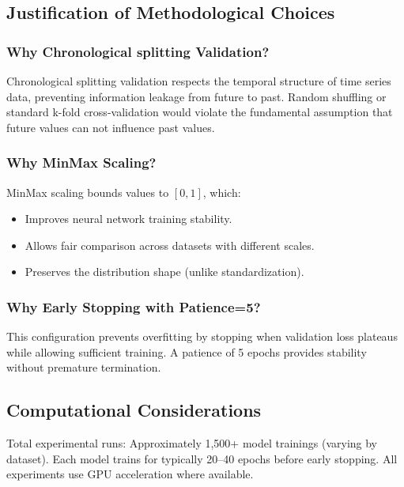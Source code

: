 \documentclass[conference]{IEEEtran}
\begin{document}
\subsection{Justification of Methodological Choices}

\subsubsection{Why Chronological splitting Validation?}

Chronological splitting validation respects the temporal structure
of time series data, preventing information leakage from future to
past. Random shuffling or standard k-fold cross-validation would
violate the fundamental assumption that future values can not
influence past values.

\subsubsection{Why MinMax Scaling?}

MinMax scaling bounds values to $[0,1]$, which:

\begin{itemize}
    \item Improves neural network training stability.
    \item Allows fair comparison across datasets with
    different scales.
    \item Preserves the distribution shape (unlike standardization).
\end{itemize}

\subsubsection{Why Early Stopping with Patience=5?}

This configuration prevents overfitting by stopping when validation
loss plateaus while allowing sufficient training. A patience of 5
epochs provides stability without premature termination.

\subsection{Computational Considerations}

Total experimental runs: Approximately 1,500+ model trainings
(varying by dataset). Each model trains for typically 20--40 epochs
before early stopping. All experiments use GPU acceleration where
available.
\end{document}
